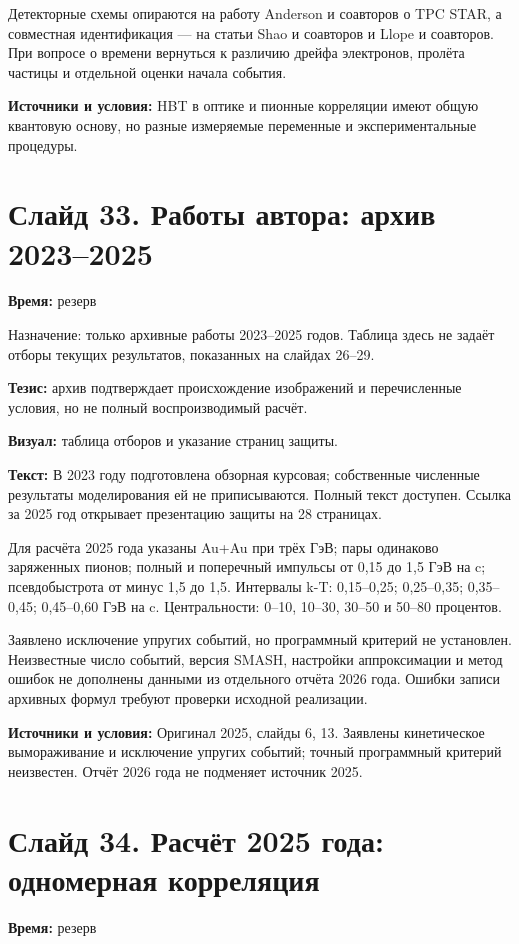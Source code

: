 \documentclass[11pt,a4paper]{article}
\begin{document}
Детекторные схемы опираются на работу Anderson и соавторов о TPC STAR, а совместная идентификация — на статьи Shao и соавторов и Llope и соавторов. При вопросе о времени вернуться к различию дрейфа электронов, пролёта частицы и отдельной оценки начала события.

\textbf{Источники и условия:} HBT в оптике и пионные корреляции имеют общую квантовую основу, но разные измеряемые переменные и экспериментальные процедуры.

\clearpage
\section*{Слайд 33. Работы автора: архив 2023–2025}
\textbf{Время:} резерв

Назначение: только архивные работы 2023–2025 годов. Таблица здесь не задаёт отборы текущих результатов, показанных на слайдах 26–29.

\textbf{Тезис:} архив подтверждает происхождение изображений и перечисленные условия, но не полный воспроизводимый расчёт.

\textbf{Визуал:} таблица отборов и указание страниц защиты.

\textbf{Текст:} В 2023 году подготовлена обзорная курсовая; собственные численные результаты моделирования ей не приписываются. Полный текст доступен. Ссылка за 2025 год открывает презентацию защиты на 28 страницах.

Для расчёта 2025 года указаны Au+Au при трёх ГэВ; пары одинаково заряженных пионов; полный и поперечный импульсы от 0,15 до 1,5 ГэВ на c; псевдобыстрота от минус 1,5 до 1,5. Интервалы k-T: 0,15–0,25; 0,25–0,35; 0,35–0,45; 0,45–0,60 ГэВ на c. Центральности: 0–10, 10–30, 30–50 и 50–80 процентов.

Заявлено исключение упругих событий, но программный критерий не установлен. Неизвестные число событий, версия SMASH, настройки аппроксимации и метод ошибок не дополнены данными из отдельного отчёта 2026 года. Ошибки записи архивных формул требуют проверки исходной реализации.

\textbf{Источники и условия:} Оригинал 2025, слайды 6, 13. Заявлены кинетическое вымораживание и исключение упругих событий; точный программный критерий неизвестен. Отчёт 2026 года не подменяет источник 2025.

\clearpage
\section*{Слайд 34. Расчёт 2025 года: одномерная корреляция}
\textbf{Время:} резерв
\end{document}
